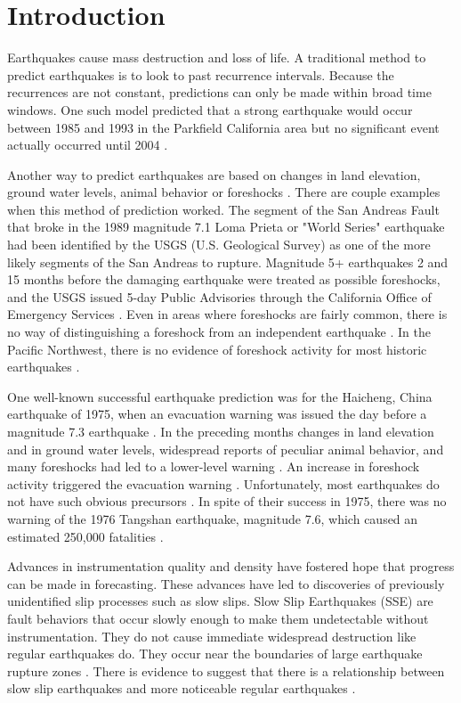 \documentclass[]{llncs} %
\begin{document}
\section{Introduction}
Earthquakes cause mass destruction and loss of life. A traditional method to predict earthquakes is to look to past recurrence intervals. Because the recurrences are not constant, predictions can only be made within broad time windows. One such model predicted that a strong earthquake would occur between 1985 and 1993 in the Parkfield California area but no significant event actually occurred until 2004 \cite{Jackson}. \par
Another way to predict earthquakes are based on changes in land elevation, ground water levels, animal behavior or foreshocks \cite{PNSN}. There are couple examples when this method of prediction worked. The segment of the San Andreas Fault that broke in the 1989 magnitude 7.1 Loma Prieta or "World Series" earthquake had been identified by the USGS (U.S. Geological Survey) as one of the more likely segments of the San Andreas to rupture. Magnitude 5+ earthquakes 2 and 15 months before the damaging earthquake were treated as possible foreshocks, and the USGS issued 5-day Public Advisories through the California Office of Emergency Services \cite{PNSN}. Even in areas where foreshocks are fairly common, there is no way of distinguishing a foreshock from an independent earthquake \cite{PNSN}. In the Pacific Northwest, there is no evidence of foreshock activity for most historic earthquakes \cite{PNSN}.\par
One well-known successful earthquake prediction was for the Haicheng, China earthquake of 1975, when an evacuation warning was issued the day before a magnitude 7.3 earthquake \cite{PNSN}. In the preceding months changes in land elevation and in ground water levels, widespread reports of peculiar animal behavior, and many foreshocks had led to a lower-level warning \cite{PNSN}. An increase in foreshock activity triggered the evacuation warning \cite{PNSN}. Unfortunately, most earthquakes do not have such obvious precursors \cite{PNSN}. In spite of their success in 1975, there was no warning of the 1976 Tangshan earthquake, magnitude 7.6, which caused an estimated 250,000 fatalities \cite{PNSN}.\par
Advances in instrumentation quality and density have fostered hope that progress can be made in forecasting. These advances have led to discoveries of previously unidentified slip processes such as slow slips. Slow Slip Earthquakes (SSE) are fault behaviors that occur slowly enough to make them undetectable without instrumentation. They do not cause immediate widespread destruction like regular earthquakes do. They occur near the boundaries of large earthquake rupture zones \cite{Slip}. There is evidence to suggest that there is a relationship between slow slip earthquakes and more noticeable regular earthquakes \cite{SlowSlip}. \par
\end{document}
